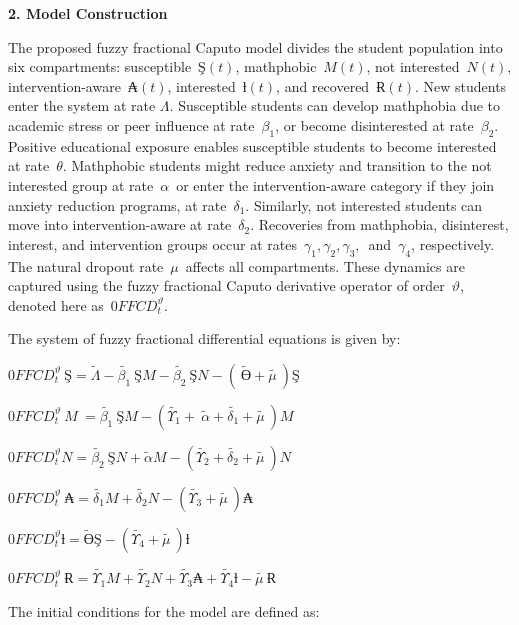\documentclass[
]{article}
\begin{document}
\textbf{2. Model Construction}

The proposed fuzzy fractional Caputo model divides the student population into six compartments: susceptible~\(Ş(t)\), mathphobic~\(M(t)\), not interested~\(N(t)\), intervention-aware~\(₳(t)\), interested~\(ƚ(t)\), and recovered~\(Ɍ(t)\). New students enter the system at rate \(\Lambda\). Susceptible students can develop mathphobia due to academic stress or peer influence at rate~\(\beta_{1}\), or become disinterested at rate~\(\beta_{2}\). Positive educational exposure enables susceptible students to become interested at rate~\(\theta\). Mathphobic students might reduce anxiety and transition to the not interested group at rate~\(\alpha\)~or enter the intervention-aware category if they join anxiety reduction programs, at rate~\(\delta_{1}\). Similarly, not interested students can move into intervention-aware at rate~\(\delta_{2}\). Recoveries from mathphobia, disinterest, interest, and intervention groups occur at rates~\(\gamma_{1},\gamma_{2},\gamma_{3},\)~and~\(\gamma_{4}\), respectively. The natural dropout rate~\(\mu\)~affects all compartments. These dynamics are captured using the fuzzy fractional Caputo derivative operator of order~\(\vartheta\), denoted here as~\(0FFCD_{t}^{\vartheta}\).

The system of fuzzy fractional differential equations is given by:

\(0FFCD_{t}^{\vartheta}\ Ş = \widetilde{\Lambda} - \widetilde{\beta_{1}}\ ŞM - \widetilde{\beta_{2}}\ ŞN - \left( \ \widetilde{Ө} + \widetilde{\mu\ } \right)Ş\)

\(0FFCD_{t}^{\vartheta}\ M\  = \widetilde{\beta_{1}}\ ŞM - \left( \widetilde{\Upsilon_{1}} + \ \widetilde{\alpha} + \widetilde{\delta_{1}} + \widetilde{\mu\ } \right)M\)

\(0FFCD_{t}^{\vartheta}N = \widetilde{\beta_{2}}\ ŞN + \widetilde{\alpha}M - \left( \widetilde{\Upsilon_{2}} + \widetilde{\delta_{2}} + \widetilde{\mu\ } \right)N\)

\(0FFCD_{t}^{\vartheta}\ ₳ = \widetilde{\delta_{1}}M + \widetilde{\delta_{2}}N - \left( \widetilde{\Upsilon_{3}} + \widetilde{\mu\ } \right)₳\)

\(0FFCD_{t}^{\vartheta}ƚ = \widetilde{Ө}Ş - \left( \widetilde{\Upsilon_{4}} + \widetilde{\mu\ } \right)ƚ\)

\(0FFCD_{t}^{\vartheta}\ Ɍ = \widetilde{\Upsilon_{1}}M + \widetilde{\Upsilon_{2}}N + \widetilde{\Upsilon_{3}}₳ + \widetilde{\Upsilon_{4}}ƚ - \widetilde{\mu\ }Ɍ\)

The initial conditions for the model are defined as:
\end{document}
